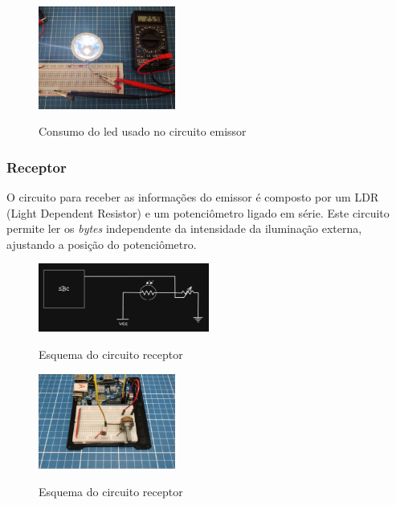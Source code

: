 \begin{figure}[!htbp]
  \caption{Consumo do led usado no circuito emissor}
  \includegraphics[width=0.4\textwidth]{images/consumo_led.jpg}
  \label{corrente_led}
\end{figure}


\subsubsection{Receptor}

O circuito para receber as informações do emissor é composto por um LDR (Light Dependent Resistor) e um potenciômetro ligado em série. Este circuito permite ler os \emph{bytes} independente da intensidade da iluminação externa, ajustando a posição do potenciômetro.

\begin{figure}[!htbp]
  \caption{Esquema do circuito receptor}
  \includegraphics[width=0.5\textwidth]{images/esquema_circuito_receptor.png}
  \label{esquema-circuito-receptor}
\end{figure}


\begin{figure}[!htbp]
  \caption{Esquema do circuito receptor}
  \includegraphics[width=0.4\textwidth]{images/foto_circuito_receptor.jpg}
  \label{foto-circuito-receptor}
\end{figure}


